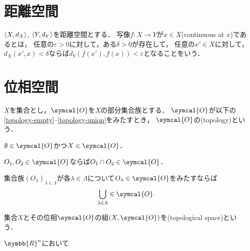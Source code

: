 \documentclass[../main.tex]{subfiles}
\begin{document}
\nocite{uchida}
\nocite{introduction-to-topology}

\section{距離空間}
\begin{thmbox}
\begin{definition}
\(\langle X, d_{X} \rangle\), \(\langle Y, d_{Y} \rangle\)を距離空間とする．
写像\(f\colon X \to Y\)が\(x \in X\)(continuous at \(x\))であるとは，
任意の\(\varepsilon > 0\)に対して，ある\(\delta > 0\)が存在して，
任意の\(x' \in X\)に対して，\(d_{X}(x', x) < \delta\)ならば\(d_{Y}(f(x'), f(x)) < \varepsilon\)となることをいう．
\end{definition}
\end{thmbox}


\section{位相空間}
\begin{thmbox}
\begin{definition}
\(X\)を集合とし，\(\symcal{O}\)を\(X\)の部分集合族とする．
\(\symcal{O}\)が以下の\ref{topology-empty}--\ref{topology-union}をみたすとき，
\(\symcal{O}\)の(topology)という．
\begin{conditions}
    \item\label{topology-empty} \(\emptyset \in \symcal{O}\)かつ\(X \in \symcal{O}\)．
    \item\label{topology-intersection} \(O_1, O_2 \in \symcal{O}\)ならば\(O_1 \cap O_2 \in \symcal{O}\)．
    \item\label{topology-union} 集合族\({(O_\lambda)}_{\lambda \in \Lambda}\)が各\(\lambda \in \Lambda\)について\(O_\lambda \in \symcal{O}\)をみたすならば
        \begin{align}
            \bigcup_{\lambda \in \Lambda} \in \symcal{O}.
        \end{align}
\end{conditions}
集合\(X\)とその位相\(\symcal{O}\)の組\((X, \symcal{O})\)を(topological space)という．
\end{definition}
\end{thmbox}

\begin{thmbox}
\begin{definition}
\(\symbb{R}^n\)において
\end{definition}
\end{thmbox}
\end{document}
